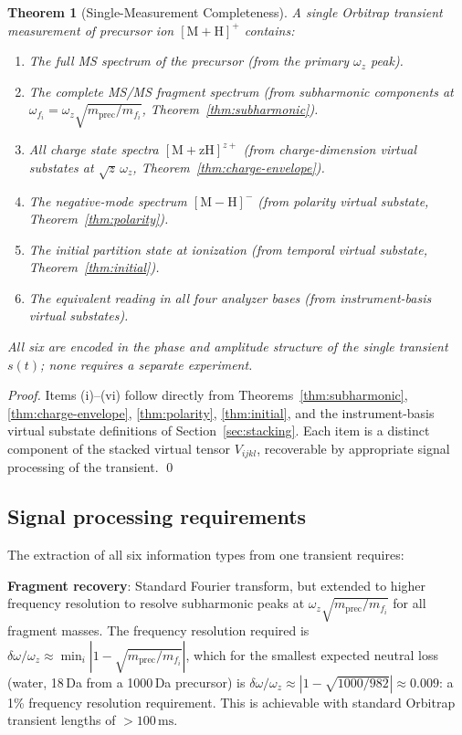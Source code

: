 \documentclass[twocolumn,10pt,a4paper]{article}
\theoremstyle{thmstyle}
\newtheorem{theorem}{Theorem}[section]
\theoremstyle{definition}
\theoremstyle{remark}
\begin{document}
\begin{theorem}[Single-Measurement Completeness]
\label{thm:completeness}
A single Orbitrap transient measurement of precursor ion
$[\mathrm{M+H}]^+$ contains:
\begin{enumerate}[nosep,label=(\roman*)]
\item The full MS spectrum of the precursor (from the primary $\omega_z$ peak).
\item The complete MS/MS fragment spectrum (from subharmonic components
  at $\omega_{f_i} = \omega_z\sqrt{m_{\text{prec}}/m_{f_i}}$,
  Theorem~\ref{thm:subharmonic}).
\item All charge state spectra $[\mathrm{M+zH}]^{z+}$ (from
  charge-dimension virtual substates at $\sqrt{z}\,\omega_z$,
  Theorem~\ref{thm:charge-envelope}).
\item The negative-mode spectrum $[\mathrm{M-H}]^-$ (from polarity
  virtual substate, Theorem~\ref{thm:polarity}).
\item The initial partition state at ionization (from temporal virtual
  substate, Theorem~\ref{thm:initial}).
\item The equivalent reading in all four analyzer bases (from
  instrument-basis virtual substates).
\end{enumerate}
All six are encoded in the phase and amplitude structure of the
single transient $s(t)$; none requires a separate experiment.
\end{theorem}

\begin{proof}
Items (i)--(vi) follow directly from Theorems~\ref{thm:subharmonic},
\ref{thm:charge-envelope}, \ref{thm:polarity}, \ref{thm:initial}, and
the instrument-basis virtual substate definitions of
Section~\ref{sec:stacking}. Each item is a distinct component of the
stacked virtual tensor $V_{ijkl}$, recoverable by appropriate
signal processing of the transient. \qed
\end{proof}

\subsection{Signal processing requirements}

The extraction of all six information types from one transient requires:

\textbf{Fragment recovery}: Standard Fourier transform, but extended to
higher frequency resolution to resolve subharmonic peaks at
$\omega_z\sqrt{m_{\text{prec}}/m_{f_i}}$ for all fragment masses. The
frequency resolution required is $\delta\omega/\omega_z \approx
\min_i |1 - \sqrt{m_{\text{prec}}/m_{f_i}}|$, which for the smallest
expected neutral loss (water, 18\,Da from a 1000\,Da precursor) is
$\delta\omega/\omega_z \approx |1 - \sqrt{1000/982}| \approx 0.009$:
a 1\% frequency resolution requirement. This is achievable with
standard Orbitrap transient lengths of $>100\,\mathrm{ms}$.
\end{document}
